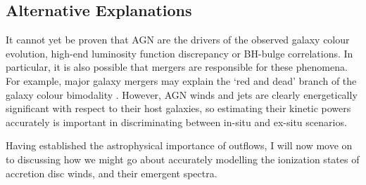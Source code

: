 \subsection{Alternative Explanations}

It cannot yet be proven that AGN are the drivers of the observed 
galaxy colour evolution, high-end luminosity function discrepancy or
BH-bulge correlations. 
In particular, it is also possible that mergers are responsible for these phenomena. 
For example, major galaxy mergers may explain the `red and dead' branch
of the galaxy colour bimodality \citep[e.g.][]{somerville2001,baldry2004}. 
However, AGN winds and jets are clearly 
energetically significant with respect to their host galaxies, so estimating
their kinetic powers accurately is important in discriminating between in-situ
and ex-situ scenarios. 

Having established the astrophysical importance of outflows, 
I will now move on to discussing how we might go about 
accurately modelling the ionization states of accretion disc winds, 
and their emergent spectra.


